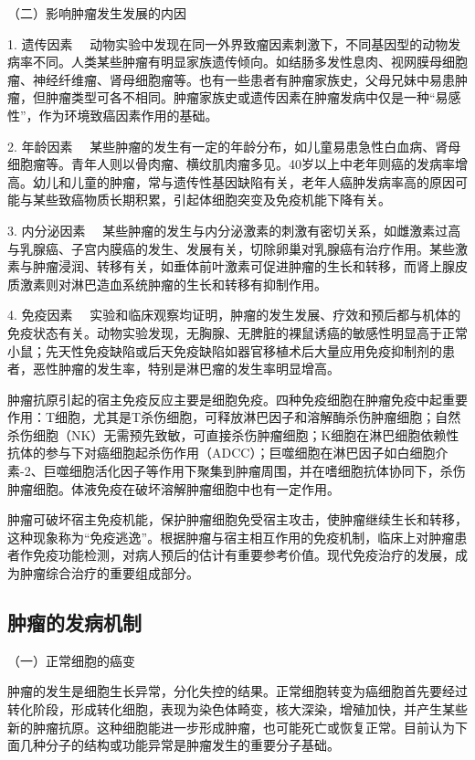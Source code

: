{ {（二）影响肿瘤发生发展的内因} }

{1. 遗传因素}
　动物实验中发现在同一外界致瘤因素刺激下，不同基因型的动物发病率不同。人类某些肿瘤有明显家族遗传倾向。如结肠多发性息肉、视网膜母细胞瘤、神经纤维瘤、肾母细胞瘤等。也有一些患者有肿瘤家族史，父母兄妹中易患肿瘤，但肿瘤类型可各不相同。肿瘤家族史或遗传因素在肿瘤发病中仅是一种“易感性”，作为环境致癌因素作用的基础。

{2. 年龄因素}
　某些肿瘤的发生有一定的年龄分布，如儿童易患急性白血病、肾母细胞瘤等。青年人则以骨肉瘤、横纹肌肉瘤多见。40岁以上中老年则癌的发病率增高。幼儿和儿童的肿瘤，常与遗传性基因缺陷有关，老年人癌肿发病率高的原因可能与某些致癌物质长期积累，引起体细胞突变及免疫机能下降有关。

{3. 内分泌因素}
　某些肿瘤的发生与内分泌激素的刺激有密切关系，如雌激素过高与乳腺癌、子宫内膜癌的发生、发展有关，切除卵巢对乳腺癌有治疗作用。某些激素与肿瘤浸润、转移有关，如垂体前叶激素可促进肿瘤的生长和转移，而肾上腺皮质激素则对淋巴造血系统肿瘤的生长和转移有抑制作用。

{4. 免疫因素}
　实验和临床观察均证明，肿瘤的发生发展、疗效和预后都与机体的免疫状态有关。动物实验发现，无胸腺、无脾脏的裸鼠诱癌的敏感性明显高于正常小鼠；先天性免疫缺陷或后天免疫缺陷如器官移植术后大量应用免疫抑制剂的患者，恶性肿瘤的发生率，特别是淋巴瘤的发生率明显增高。

肿瘤抗原引起的宿主免疫反应主要是细胞免疫。四种免疫细胞在肿瘤免疫中起重要作用：T细胞，尤其是T杀伤细胞，可释放淋巴因子和溶解酶杀伤肿瘤细胞；自然杀伤细胞（NK）无需预先致敏，可直接杀伤肿瘤细胞；K细胞在淋巴细胞依赖性抗体的参与下对癌细胞起杀伤作用（ADCC）；巨噬细胞在淋巴因子如白细胞介素-2、巨噬细胞活化因子等作用下聚集到肿瘤周围，并在嗜细胞抗体协同下，杀伤肿瘤细胞。体液免疫在破坏溶解肿瘤细胞中也有一定作用。

肿瘤可破坏宿主免疫机能，保护肿瘤细胞免受宿主攻击，使肿瘤继续生长和转移，这种现象称为“免疫逃逸”。根据肿瘤与宿主相互作用的免疫机制，临床上对肿瘤患者作免疫功能检测，对病人预后的估计有重要参考价值。现代免疫治疗的发展，成为肿瘤综合治疗的重要组成部分。

\subsection{肿瘤的发病机制}

{（一）正常细胞的癌变}

肿瘤的发生是细胞生长异常，分化失控的结果。正常细胞转变为癌细胞首先要经过转化阶段，形成转化细胞，表现为染色体畸变，核大深染，增殖加快，并产生某些新的肿瘤抗原。这种细胞能进一步形成肿瘤，也可能死亡或恢复正常。目前认为下面几种分子的结构或功能异常是肿瘤发生的重要分子基础。

